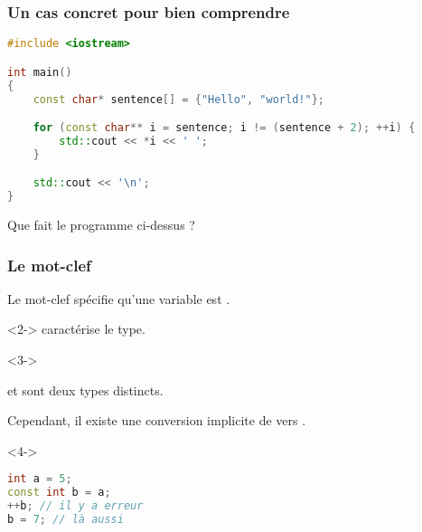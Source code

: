 \documentclass{cppcourses}
\begin{document}
\begin{frame}[fragile]

\frametitle{Un cas concret pour bien comprendre}

\begin{example}

\begin{lstlisting}[language=c++]
#include <iostream>

int main()
{
    const char* sentence[] = {"Hello", "world!"};

    for (const char** i = sentence; i != (sentence + 2); ++i) {
        std::cout << *i << ' ';
    }

    std::cout << '\n';
}
\end{lstlisting}

Que fait le programme ci-dessus ?


\end{example}

\end{frame}

\begin{frame}[fragile]

\frametitle{Le mot-clef }

Le mot-clef  spécifie qu'une variable est .

\begin{remark}<2->
 caractérise le type.
\end{remark}

\begin{example}<3->

 et  sont deux types distincts.

Cependant, il existe une conversion implicite de \mykeyword{\textcolor{orange}{<type>}} vers .

\end{example}

\begin{example}<4->

\begin{lstlisting}[language=c++]
int a = 5;
const int b = a;
++b; // il y a erreur
b = 7; // là aussi
\end{lstlisting}

\end{example}

\end{frame}
\end{document}
